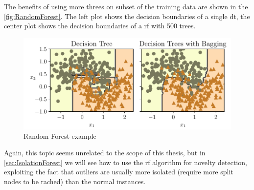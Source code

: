 The benefits of using more threes on subset of the training data are shown in the \autoref{fig:RandomForest}. The left plot shows the decision boundaries of a single \gls{dt}, the center plot shows the decision boundaries of a \gls{rf} with 500 trees.

\begin{figure}
    \centering
    \includegraphics{images/MachineLearning/RandomForest.pdf}
    \caption{Random Forest example }
    \label{fig:RandomForest}
\end{figure}

Again, this topic seems unrelated to the scope of this thesis, but in \autoref{sec:IsolationForest} we will see how to use the \gls{rf} algorithm for novelty detection, exploiting the fact that outliers are usually more isolated (require more split nodes to be rached) than the normal instances.